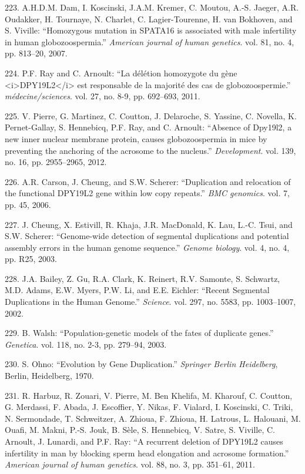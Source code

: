 \documentclass[12pt,a4paper,twoside]{ugathesis}
\theoremstyle{definition}
\theoremstyle{definition}
\theoremstyle{definition}
\theoremstyle{remark}
\begin{document}
\hypertarget{ref-Dam2007}{}
223. A.H.D.M. Dam, I. Koscinski, J.A.M. Kremer, C. Moutou, A.-S. Jaeger,
A.R. Oudakker, H. Tournaye, N. Charlet, C. Lagier-Tourenne, H. van
Bokhoven, and S. Viville: ``Homozygous mutation in SPATA16 is associated
with male infertility in human globozoospermia.'' \emph{American journal
of human genetics}. vol. 81, no. 4, pp. 813--20, 2007.

\hypertarget{ref-Ray2011}{}
224. P.F. Ray and C. Arnoult: ``La délétion homozygote du gène
\textless{}i\textgreater{}DPY19L2\textless{}/i\textgreater{} est
responsable de la majorité des cas de globozoospermie.''
\emph{médecine/sciences}. vol. 27, no. 8-9, pp. 692--693, 2011.

\hypertarget{ref-Pierre2012}{}
225. V. Pierre, G. Martinez, C. Coutton, J. Delaroche, S. Yassine, C.
Novella, K. Pernet-Gallay, S. Hennebicq, P.F. Ray, and C. Arnoult:
``Absence of Dpy19l2, a new inner nuclear membrane protein, causes
globozoospermia in mice by preventing the anchoring of the acrosome to
the nucleus.'' \emph{Development}. vol. 139, no. 16, pp. 2955--2965,
2012.

\hypertarget{ref-Carson2006}{}
226. A.R. Carson, J. Cheung, and S.W. Scherer: ``Duplication and
relocation of the functional DPY19L2 gene within low copy repeats.''
\emph{BMC genomics}. vol. 7, pp. 45, 2006.

\hypertarget{ref-Cheung2003}{}
227. J. Cheung, X. Estivill, R. Khaja, J.R. MacDonald, K. Lau, L.-C.
Tsui, and S.W. Scherer: ``Genome-wide detection of segmental
duplications and potential assembly errors in the human genome
sequence.'' \emph{Genome biology}. vol. 4, no. 4, pp. R25, 2003.

\hypertarget{ref-Bailey2002}{}
228. J.A. Bailey, Z. Gu, R.A. Clark, K. Reinert, R.V. Samonte, S.
Schwartz, M.D. Adams, E.W. Myers, P.W. Li, and E.E. Eichler: ``Recent
Segmental Duplications in the Human Genome.'' \emph{Science}. vol. 297,
no. 5583, pp. 1003--1007, 2002.

\hypertarget{ref-Walsh2003}{}
229. B. Walsh: ``Population-genetic models of the fates of duplicate
genes.'' \emph{Genetica}. vol. 118, no. 2-3, pp. 279--94, 2003.

\hypertarget{ref-Ohno1970}{}
230. S. Ohno: ``Evolution by Gene Duplication.'' \emph{Springer Berlin
Heidelberg}, Berlin, Heidelberg, 1970.

\hypertarget{ref-Harbuz2011a}{}
231. R. Harbuz, R. Zouari, V. Pierre, M. Ben Khelifa, M. Kharouf, C.
Coutton, G. Merdassi, F. Abada, J. Escoffier, Y. Nikas, F. Vialard, I.
Koscinski, C. Triki, N. Sermondade, T. Schweitzer, A. Zhioua, F. Zhioua,
H. Latrous, L. Halouani, M. Ouafi, M. Makni, P.-S. Jouk, B. Sèle, S.
Hennebicq, V. Satre, S. Viville, C. Arnoult, J. Lunardi, and P.F. Ray:
``A recurrent deletion of DPY19L2 causes infertility in man by blocking
sperm head elongation and acrosome formation.'' \emph{American journal
of human genetics}. vol. 88, no. 3, pp. 351--61, 2011.
\end{document}
